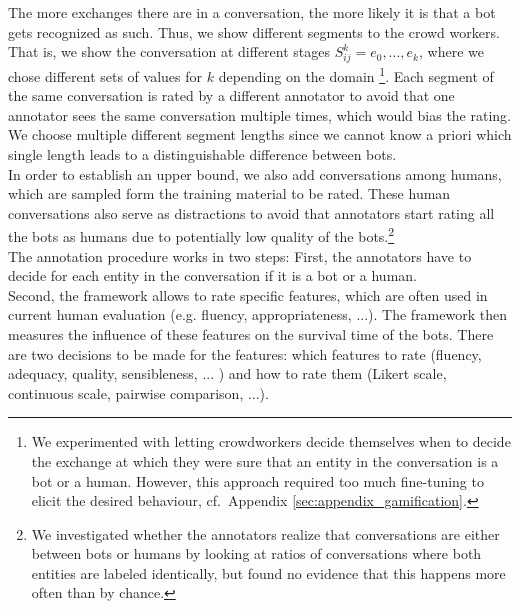 \documentclass[11pt,a4paper]{article}
\begin{document}
 The more exchanges there are in a conversation, the more likely it is that a bot gets recognized as such. Thus, we show different segments to the crowd workers. That is, we show the conversation at different stages $S_{ij}^k = e_0, ..., e_k$, where we chose different sets of values for $k$ depending on the domain \footnote{We experimented with letting crowdworkers decide themselves when to decide the exchange at which they were sure that an entity in the conversation is a bot or a human. However, this approach required too much fine-tuning to elicit the desired behaviour, cf.\ Appendix \ref{sec:appendix_gamification}.}.  Each segment of the same conversation is rated by a different annotator to avoid that one annotator sees the same conversation multiple  times, which would bias the rating. We choose multiple different segment lengths since we cannot know a priori which single length leads to a distinguishable difference between bots.\\
 In order to establish an upper bound, we also add conversations among humans, which are sampled form the training material to be rated. These human conversations also serve as distractions to avoid that annotators start rating all the bots as humans due to potentially low quality of the bots.\footnote{We investigated whether the annotators realize that conversations are either between bots or humans by looking at ratios of conversations where both entities are labeled identically, but found no evidence that this happens more often than by chance.} \\
 The annotation procedure works in two steps: First, the annotators have to decide for each entity in the conversation if it is a bot or a human. \\
Second, the framework allows to rate specific features, which are often used in current human evaluation (e.g. fluency, appropriateness, ...). The framework then measures the influence of these features on the survival time of the bots. There are two decisions to be made for the features: which features to rate (fluency, adequacy, quality, sensibleness, ... ) and how to rate them (Likert scale, continuous scale, pairwise comparison, ...).
\end{document}
